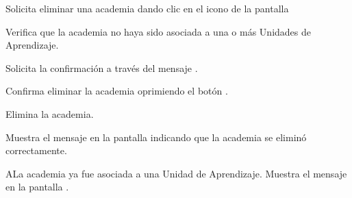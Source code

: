 \begin{UCtrayectoria}
	\UCpaso [\UCactor] Solicita eliminar una academia dando clic en el icono %
	de la pantalla 
	
	\UCpaso [\UCsist] Verifica que la academia no haya sido asociada a una o más Unidades de Aprendizaje. 
	
	\UCpaso [\UCsist] Solicita la confirmación a través del mensaje .
	
	\UCpaso [\UCactor] Confirma eliminar la academia oprimiendo el botón .
	
	\UCpaso [\UCsist] Elimina la academia.
	
	\UCpaso [\UCsist] Muestra el mensaje  en la pantalla  indicando que la academia se eliminó correctamente.	
	
\end{UCtrayectoria}

\begin{UCtrayectoriaA}{A}{La academia ya fue asociada a una Unidad de Aprendizaje.}
	\UCpaso [\UCsist] Muestra el mensaje  en la pantalla . 
\end{UCtrayectoriaA}
